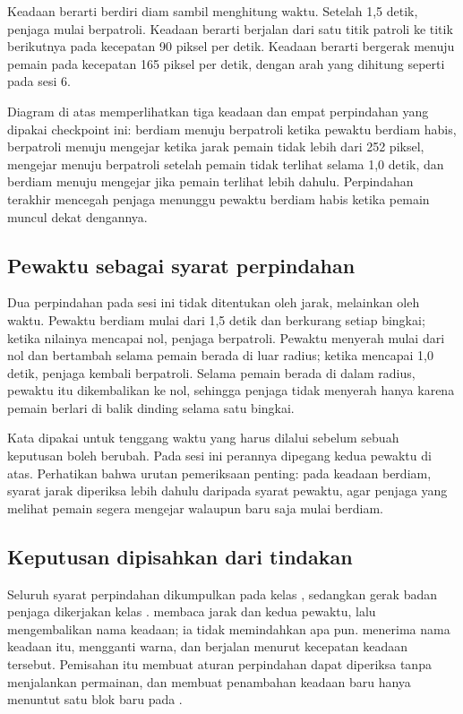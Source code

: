 Keadaan  berarti berdiri diam sambil menghitung waktu. Setelah
1,5 detik, penjaga mulai berpatroli. Keadaan  berarti berjalan
dari satu titik patroli ke titik berikutnya pada kecepatan 90 piksel per detik.
Keadaan  berarti bergerak menuju pemain pada kecepatan 165
piksel per detik, dengan arah yang dihitung seperti pada sesi 6.

\begin{center}\end{center}

Diagram di atas memperlihatkan tiga keadaan dan empat perpindahan yang dipakai
checkpoint ini: berdiam menuju berpatroli ketika pewaktu berdiam habis,
berpatroli menuju mengejar ketika jarak pemain tidak lebih dari 252 piksel,
mengejar menuju berpatroli setelah pemain tidak terlihat selama 1,0 detik, dan
berdiam menuju mengejar jika pemain terlihat lebih dahulu. Perpindahan terakhir
mencegah penjaga menunggu pewaktu berdiam habis ketika pemain muncul dekat
dengannya.

\subsection*{Pewaktu sebagai syarat perpindahan}

Dua perpindahan pada sesi ini tidak ditentukan oleh jarak, melainkan oleh waktu.
Pewaktu berdiam mulai dari 1,5 detik dan berkurang setiap bingkai; ketika
nilainya mencapai nol, penjaga berpatroli. Pewaktu menyerah mulai dari nol dan
bertambah selama pemain berada di luar radius; ketika mencapai 1,0 detik,
penjaga kembali berpatroli. Selama pemain berada di dalam radius, pewaktu itu
dikembalikan ke nol, sehingga penjaga tidak menyerah hanya karena pemain
berlari di balik dinding selama satu bingkai.

Kata  dipakai untuk tenggang waktu yang harus dilalui sebelum
sebuah keputusan boleh berubah. Pada sesi ini perannya dipegang kedua pewaktu
di atas. Perhatikan bahwa urutan pemeriksaan penting: pada keadaan berdiam,
syarat jarak diperiksa lebih dahulu daripada syarat pewaktu, agar penjaga yang
melihat pemain segera mengejar walaupun baru saja mulai berdiam.

\subsection*{Keputusan dipisahkan dari tindakan}

Seluruh syarat perpindahan dikumpulkan pada kelas , sedangkan
gerak badan penjaga dikerjakan kelas .  membaca
jarak dan kedua pewaktu, lalu mengembalikan nama keadaan; ia tidak memindahkan
apa pun.  menerima nama keadaan itu, mengganti warna, dan berjalan
menurut kecepatan keadaan tersebut. Pemisahan itu membuat aturan perpindahan
dapat diperiksa tanpa menjalankan permainan, dan membuat penambahan keadaan
baru hanya menuntut satu blok baru pada .

